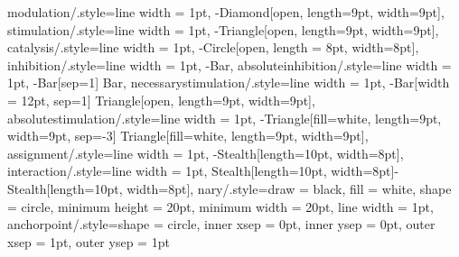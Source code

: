 {    modulation/.style={line width = 1pt, -{Diamond[open, length=9pt, width=9pt]}},
    stimulation/.style={line width = 1pt, -{Triangle[open, length=9pt, width=9pt]}},
    catalysis/.style={line width = 1pt, -{Circle[open, length = 8pt, width=8pt]}},
    inhibition/.style={line width = 1pt, -{Bar}},
    absoluteinhibition/.style={line width = 1pt, -{Bar[sep=1] Bar}},
    necessarystimulation/.style={line width = 1pt, -{Bar[width = 12pt, sep=1] Triangle[open, length=9pt, width=9pt]}},
    absolutestimulation/.style={line width = 1pt, -{Triangle[fill=white, length=9pt, width=9pt, sep=-3] Triangle[fill=white, length=9pt, width=9pt]}},
    assignment/.style={line width = 1pt, -{Stealth[length=10pt, width=8pt]}},
    interaction/.style={line width = 1pt, {Stealth[length=10pt, width=8pt]}-{Stealth[length=10pt, width=8pt]}},
    nary/.style={draw = black, fill = white, shape = circle, minimum height = 20pt, minimum width = 20pt, line width = 1pt},
    anchorpoint/.style={shape = circle, inner xsep = 0pt, inner ysep = 0pt, outer xsep = 1pt, outer ysep = 1pt}}
